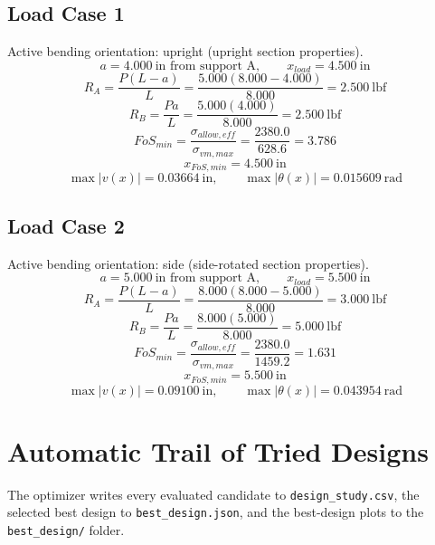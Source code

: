 \documentclass[11pt]{article}
\begin{document}
\subsection*{Load Case 1}
Active bending orientation: upright (upright section properties).
\[a = 4.000\ \mathrm{in} \text{ from support A}, \qquad x_{load} = 4.500\ \mathrm{in}\]
\[R_A = \frac{P(L-a)}{L} = \frac{5.000(8.000-4.000)}{8.000} = 2.500\ \mathrm{lbf}\]
\[R_B = \frac{Pa}{L} = \frac{5.000(4.000)}{8.000} = 2.500\ \mathrm{lbf}\]
\[FoS_{min} = \frac{\sigma_{allow,eff}}{\sigma_{vm,max}} = \frac{2380.0}{628.6} = 3.786\]
\[x_{FoS,min} = 4.500\ \mathrm{in}\]
\[\max |v(x)| = 0.03664\ \mathrm{in}, \qquad \max |\theta(x)| = 0.015609\ \mathrm{rad}\]
\subsection*{Load Case 2}
Active bending orientation: side (side-rotated section properties).
\[a = 5.000\ \mathrm{in} \text{ from support A}, \qquad x_{load} = 5.500\ \mathrm{in}\]
\[R_A = \frac{P(L-a)}{L} = \frac{8.000(8.000-5.000)}{8.000} = 3.000\ \mathrm{lbf}\]
\[R_B = \frac{Pa}{L} = \frac{8.000(5.000)}{8.000} = 5.000\ \mathrm{lbf}\]
\[FoS_{min} = \frac{\sigma_{allow,eff}}{\sigma_{vm,max}} = \frac{2380.0}{1459.2} = 1.631\]
\[x_{FoS,min} = 5.500\ \mathrm{in}\]
\[\max |v(x)| = 0.09100\ \mathrm{in}, \qquad \max |\theta(x)| = 0.043954\ \mathrm{rad}\]

\section*{Automatic Trail of Tried Designs}
The optimizer writes every evaluated candidate to \texttt{design\_study.csv}, the selected best design to \texttt{best\_design.json}, and the best-design plots to the \texttt{best\_design/} folder.
\end{document}
